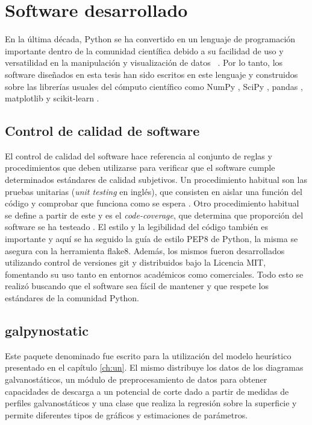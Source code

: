 \chapter{Software desarrollado}

En la última década, Python se ha convertido en un lenguaje de programación 
importante dentro de la comunidad científica debido a su facilidad de uso y 
versatilidad en la manipulación y visualización de datos ~\cite{millman2011}. 
Por lo tanto, los software diseñados en esta tesis han sido escritos en este
lenguaje y construidos sobre las librerías usuales del cómputo científico como
NumPy \cite{numpy}, SciPy \cite{scipy}, pandas \cite{pandas}, 
matplotlib \cite{matplotlib} y scikit-learn \cite{sklearn1, sklearn2}. 


\section{Control de calidad de software}

El control de calidad del software hace referencia al conjunto de reglas y 
procedimientos que deben utilizarse para verificar que el software cumple 
determinados estándares de calidad subjetivos. Un procedimiento habitual son las 
pruebas unitarias (\textit{unit testing} en inglés), que consisten en aislar una 
función del código y comprobar que funciona como se espera \cite{jazayeri2007}. 
Otro procedimiento habitual se define a partir de este y es el 
\textit{code-coverage}, que determina que proporción del software se ha testeado
\cite{miller1963}. El estilo y la legibilidad del código también es importante
y aquí se ha seguido la guía de estilo PEP8 de Python, la misma se asegura con 
la herramienta flake8. Además, los mismos fueron desarrollados utilizando control 
de versiones git y distribuidos bajo la Licencia MIT, fomentando su uso tanto en 
entornos académicos como comerciales. Todo esto se realizó buscando que el 
software sea fácil de mantener y que respete los estándares de la comunidad Python.


\section{galpynostatic}\label{software:galpynostatic}

Este paquete denominado  fue escrito para la utilización
del modelo heurístico presentado en el capítulo \ref{ch:un}. El mismo distribuye 
los datos de los diagramas galvanostáticos, un módulo de preprocesamiento de datos
para obtener capacidades de descarga a un potencial de corte dado a partir de 
medidas de perfiles galvanostáticos y una clase que realiza la regresión sobre la 
superficie y permite diferentes tipos de gráficos y estimaciones de parámetros.

